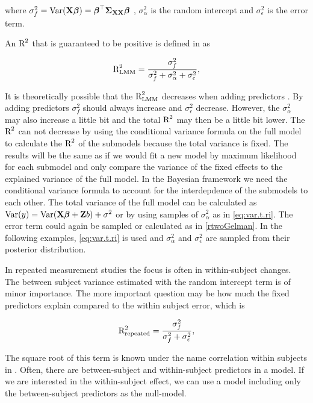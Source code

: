 \documentclass[11pt,a4paper,twoside]{book}\usepackage[]{graphicx}\usepackage[]{color}
\begin{document}
where $\sigma_{f}^2 = \operatorname{Var}({\mathbf{X}} {\boldsymbol{\beta}}) = {\boldsymbol{\beta}}^\top {\boldsymbol{\Sigma}}{}_{{\mathbf{X}} {\mathbf{X}}}  {\boldsymbol{\beta}}$ , $\sigma_{\alpha}^2 $ is the random intercept and $\sigma_{\epsilon}^2$ is the error term. 

An $\text{R}^2$ that is guaranteed to be positive is defined in \cite{Nakagawa2013} as

   \begin{align} 
\text{R}^2_{\text{LMM}} = \frac{\sigma_{f}^2}{\sigma_{f}^2 + \sigma_{\alpha}^2 + \sigma_{\epsilon}^2},
\end{align}


 It is theoretically possible that the $\text{R}^2_{\text{LMM}}$ decreases when adding predictors \citep{Nakagawa2013}.  By adding predictors $\sigma_{f}^2$  should always increase and  $\sigma_{\epsilon}^2$  decrease. However, the $\sigma_{\alpha}^2$ may also increase a little bit and the total $\text{R}^2$ may then be a little bit lower. The $\text{R}^2$ can not decrease by using the conditional variance formula on the full model to calculate the $\text{R}^2$ of the submodels because the total variance is fixed. The results will be the same as if we would fit a new model by maximum likelihood for each submodel and only compare the variance of the fixed effects to the explained variance of the full model.  In the Bayesian framework we need the conditional variance formula to account for the interdepdence of the submodels to each other. The total variance of the full model can be calculated as  $\operatorname{Var}(y) = \operatorname{Var}({\mathbf{X}} {\boldsymbol{\beta}} + {\mathbf{Z}} b) + \sigma^2$ or by using samples of $\sigma_{\alpha}^2$ as in \eqref{eq:var.t.ri}. The error term could again be sampled or calculated as in \eqref{rtwoGelman}. In the following examples, \eqref{eq:var.t.ri} is used and  $\sigma_{\alpha}^2$ and $\sigma_{\epsilon}^2$ are sampled from their posterior distribution.

In repeated measurement studies the focus is often in within-subject changes. The between subject variance estimated with the random intercept term is of minor importance. The more important question may be how much the fixed predictors explain compared to the within subject error, which is

   \begin{align} 
\text{R}^2_{\text{repeated}} = \frac{\sigma_{f}^2}{\sigma_{f}^2  + \sigma_{\epsilon}^2}, \label{rtwo.repeated}
\end{align}

The square root of this term is known under the name correlation within subjects in \cite{Bland1995}. Often, there are between-subject and within-subject predictors in a model. If we are interested in the within-subject effect, we can use a model including only the between-subject predictors as the null-model.
\end{document}
